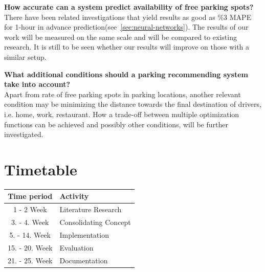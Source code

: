 \documentclass{article}
\begin{document}
\vspace{2mm}
\textbf{How accurate can a system predict availability of free parking spots?} \\
There have been related investigations that yield results as good as \%3 MAPE for 1-hour in advance prediction(see~\ref{sec:neural-networks}). The results of our work will be measured on the same scale and will be compared to existing research. It is still to be seen whether our results will improve on those with a similar setup.

\vspace{2mm}
\textbf{What additional conditions should a parking recommending system take into account?} \\
Apart from rate of free parking spots in parking locations, another relevant condition may be minimizing the distance towards the final destination of drivers, i.e. home, work, restaurant. How a trade-off between multiple optimization functions can be achieved and possibly other conditions, will be further investigated.

\section{Timetable}
\begin{table}[!ht]
 \centering
  \begin{tabular}{|c|l|}
  \hline
  \textbf{Time period} & \textbf{Activity} \\ \hline
  	1 - 2 Week & Literature Research \\ \hline
  	3. - 4. Week & Consolidating Concept  \\ \hline
  	5. - 14. Week & Implementation \\ \hline
  	15. - 20. Week & Evaluation \\ \hline
  	21. - 25. Week & Documentation \\ \hline
  \end{tabular}
\end{table}

\nocite{*}

\printbibliography
\end{document}
